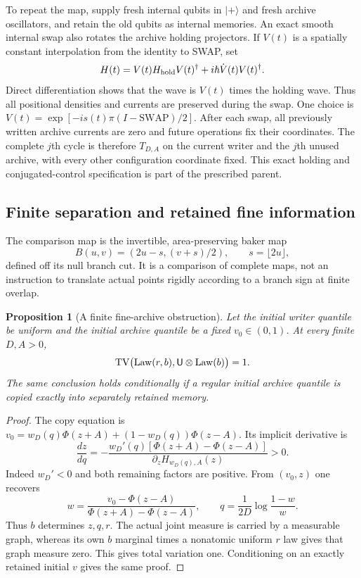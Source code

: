 \documentclass[11pt]{article}
\numberwithin{equation}{section}
\newtheorem{proposition}[theorem]{Proposition}
\theoremstyle{definition}
\theoremstyle{remark}
\begin{document}
To repeat the map, supply fresh internal qubits in $|+\rangle$ and fresh
archive oscillators, and retain the old qubits as internal memories.
An exact smooth internal swap also rotates the archive holding
projectors. If $V(t)$ is a spatially constant interpolation from the
identity to SWAP, set
\begin{equation}\label{p1p:eq:swap}
 H(t)=V(t)H_{\rm hold}V(t)^\dagger+i\hbar\dot V(t)V(t)^\dagger.
\end{equation}
Direct differentiation shows that the wave is $V(t)$ times the holding
wave. Thus all positional densities and currents are preserved during
the swap. One choice is
$V(t)=\exp[-is(t)\pi(I-\mathrm{SWAP})/2]$.
After each swap, all previously written archive currents are zero and
future operations fix their coordinates. The complete $j$th cycle is
therefore $T_{D,A}$ on the current writer and the $j$th unused archive,
with every other configuration coordinate fixed. This exact holding and
conjugated-control specification is part of the prescribed parent.

\subsection{Finite separation and retained fine information}

The comparison map is the invertible, area-preserving baker map
\begin{equation}\label{p1p:eq:baker}
 B(u,v)=(2u-s,(v+s)/2),\qquad s=\lfloor2u\rfloor,
\end{equation}
defined off its null branch cut. It is a comparison of complete maps,
not an instruction to translate actual points rigidly according to a
branch sign at finite overlap.

\begin{proposition}[A finite fine-archive obstruction]\label{p1p:prop:channel}
Let the initial writer quantile be uniform and the initial archive
quantile be a fixed $v_0\in(0,1)$. At every finite $D,A>0$,
\[
 \operatorname{TV}\bigl(\operatorname{Law}(r,b),\mathsf U\otimes\operatorname{Law}(b)\bigr)=1.
\]
The same conclusion holds conditionally if a regular initial archive
quantile is copied exactly into separately retained memory.
\end{proposition}
\begin{proof}
The copy equation is
$v_0=w_D(q)\Phi(z+A)+(1-w_D(q))\Phi(z-A)$.
Its implicit derivative is
\[
 \frac{dz}{dq}=-\frac{w_D'(q)[\Phi(z+A)-\Phi(z-A)]}
 {\partial_zH_{w_D(q),A}(z)}>0.
\]
Indeed $w_D'<0$ and both remaining factors are positive. From $(v_0,z)$
one recovers
\[
 w=\frac{v_0-\Phi(z-A)}{\Phi(z+A)-\Phi(z-A)},\qquad
 q=\frac{1}{2D}\log\frac{1-w}{w}.
\]
Thus $b$ determines $z,q,r$. The actual joint measure is carried by a
measurable graph, whereas its own $b$ marginal times a nonatomic uniform
$r$ law gives that graph measure zero. This gives total variation one.
Conditioning on an exactly retained initial $v$ gives the same proof.
\end{proof}
\end{document}
